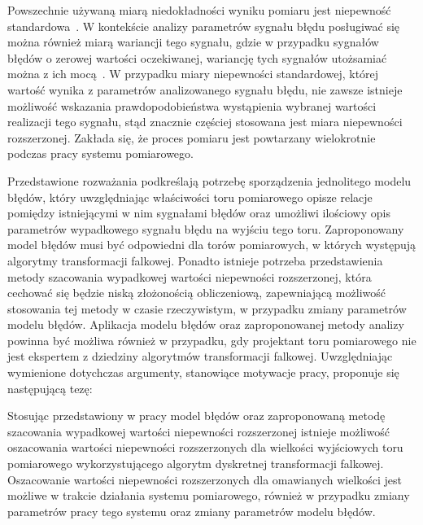 Powszechnie używaną miarą niedokładności wyniku pomiaru jest niepewność standardowa~\cite{jcgm_guide}. W kontekście analizy parametrów sygnału błędu posługiwać się można również miarą wariancji tego sygnału, gdzie w przypadku sygnałów błędów o zerowej wartości oczekiwanej, wariancję tych sygnałów utożsamiać można z ich mocą~\cite{oppenheim_sns}. W przypadku miary niepewności standardowej, której wartość wynika z parametrów analizowanego sygnału błędu, nie zawsze istnieje możliwość wskazania prawdopodobieństwa wystąpienia wybranej wartości realizacji tego sygnału, stąd znacznie częściej stosowana jest miara niepewności rozszerzonej. Zakłada się, że proces pomiaru jest powtarzany wielokrotnie podczas pracy systemu pomiarowego.

Przedstawione rozważania podkreślają potrzebę sporządzenia jednolitego modelu błędów, który uwzględniając właściwości toru pomiarowego opisze relacje pomiędzy istniejącymi w nim sygnałami błędów oraz umożliwi ilościowy opis parametrów wypadkowego sygnału błędu na wyjściu tego toru. Zaproponowany model błędów musi być odpowiedni dla torów pomiarowych, w których występują algorytmy transformacji falkowej. Ponadto istnieje potrzeba przedstawienia metody szacowania wypadkowej wartości niepewności rozszerzonej, która cechować się będzie niską złożonością obliczeniową, zapewniającą możliwość stosowania tej metody w czasie rzeczywistym, w przypadku zmiany parametrów modelu błędów. Aplikacja modelu błędów oraz zaproponowanej metody analizy powinna być możliwa również w przypadku, gdy projektant toru pomiarowego nie jest ekspertem z dziedziny algorytmów transformacji falkowej. Uwzględniając wymienione dotychczas argumenty, stanowiące motywacje pracy, proponuje się następującą tezę:
\begin{quoting}[font = bfseries]
Stosując przedstawiony w pracy model błędów oraz zaproponowaną metodę szacowania wypadkowej wartości niepewności rozszerzonej istnieje możliwość oszacowania wartości niepewności rozszerzonych dla wielkości wyjściowych toru pomiarowego wykorzystującego algorytm dyskretnej transformacji falkowej. Oszacowanie wartości niepewności rozszerzonych dla omawianych wielkości jest możliwe w trakcie działania systemu pomiarowego, również w przypadku zmiany parametrów pracy tego systemu oraz zmiany parametrów modelu błędów.
\end{quoting}

